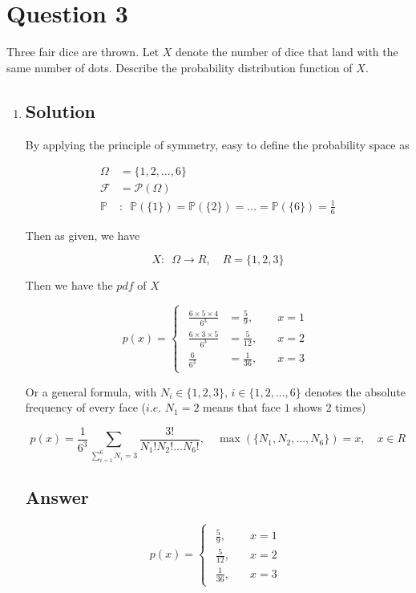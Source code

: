 \documentclass[12pt]{article}
\newcommand{\bP}{\mathbb{P}}
\begin{document}
	
	\section*{Question 3}
	
	\noindent Three fair dice are thrown. Let $X$ denote the number of dice that land with the same number of dots. Describe the probability distribution function of $X$.
	
	\bigskip
	
	\begin{enumerate}[label={},leftmargin=0in]\item
		\subsection*{Solution}
		
			By applying the principle of symmetry, easy to define the probability space as
			
			\[
			\begin{aligned}
				\Omega &= \{1,2,\dots,6\}\\
				\mathcal{F} &= \mathcal{P}(\Omega)\\
				\bP &:\enspace \bP(\{1\}) = \bP(\{2\}) = \dots = \bP(\{6\}) = \frac{1}{6}
			\end{aligned}
			\]
			
			Then as given, we have
			
			\[X:\enspace \Omega \rightarrow R,\quad R = \{1,2,3\}\]
			
			Then we have the $pdf$ of $X$
			
			\[
			p(x) =
			\begin{cases}
				\begin{aligned}
					\frac{6\times 5\times 4}{6^3} &= \frac{5}{9},&\quad x = 1\\
					\frac{6\times 3\times 5}{6^3} &= \frac{5}{12},&\quad x = 2\\
					\frac{6}{6^3} &= \frac{1}{36},&\quad x = 3
				\end{aligned}
			\end{cases}
			\]
			
			Or a general formula, with $N_i \in \{1,2,3\},\, i\in \{1,2,\dots,6\}$ denotes the absolute frequency of every face ($i.e.$ $N_1 = 2$ means that face $1$ shows $2$ times)
			
			\[
				p(x) = \frac{1}{6^3}\sum_{\sum_{i=1}^6N_i=3}\frac{3!}{N_1!N_2!\dots N_6!},\quad \max(\{N_1,N_2,\dots,N_6\}) = x,\quad x\in R
			\]
		
		\subsection*{Answer}
		
			\[\boxed{p(x) =
				\begin{cases}
					\begin{aligned}
						\frac{5}{9},&\quad x = 1\\
						\frac{5}{12},&\quad x = 2\\
						\frac{1}{36},&\quad x = 3
					\end{aligned}
			\end{cases}}\]
	\end{enumerate}
	
\end{document}

